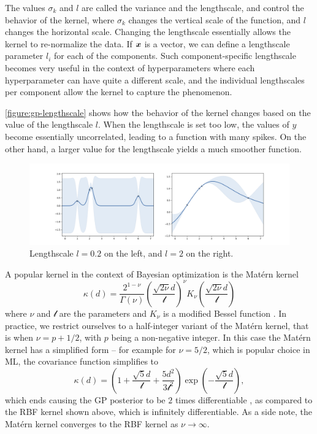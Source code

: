 The values $\sigma_k$ and $l$ are called the variance and the lengthscale, and control
the behavior of the kernel, where $\sigma_k$ changes the vertical scale of the
function, and $l$ changes the horizontal scale. Changing the lengthscale
essentially allows the kernel to re-normalize the data. If ${\boldsymbol{x}}$ is a vector, we
can define a lengthscale parameter $l_i$ for each of the components. Such
component-specific lengthscale becomes very useful in the context of hyperparameters where each hyperparameter
can have quite a different scale, and the individual lengthscales per component
allow the kernel to capture the phenomenon.

\autoref{figure:gp-lengthscale} shows how the behavior of the kernel
changes based on the value of the lengthscale $l$. When the lengthscale
is set too low, the values of $y$ become essentially uncorrelated, leading to a
function with many spikes. On the other hand, a larger value for the lengthscale
yields a much smoother function.

\begin{figure}
  \begin{center}
    \includegraphics[width=1.0\textwidth]{images/gp-lengthscale.png}
    \caption{Lengthscale $l = 0.2$ on the left, and $l = 2$ on the right.}

    \label{figure:gp-lengthscale}
  \end{center}
\end{figure}

A popular kernel in the context of Bayesian optimization is the Mat\'ern kernel
$$
\kappa(d) = \frac{2^{1 - \nu}}{\Gamma(\nu)} \left( \frac{\sqrt{2\nu}d}{\mathcal{l}} \right)^\nu K_\nu \left( \frac{\sqrt{2\nu}d}{\mathcal{l}} \right)
$$
where $\nu$ and $\mathcal{l}$ are the parameters and $K_\nu$ is a modified Bessel function \citep{williams2006gaussian}. In practice, we restrict ourselves to a half-integer variant of the Mat\'ern kernel, that is when $\nu = p + 1/2$, with $p$ being a non-negative integer. In this case the Mat\'ern kernel has a simplified form -- for example for $\nu = 5/2$, which is popular choice in ML, the covariance function simplifies to
$$
\kappa(d) = \left( 1 + \frac{\sqrt{5}d}{\mathcal{l}} + \frac{5d^2}{3\mathcal{l}^2} \right) \exp \left( - \frac{\sqrt{5}d}{\mathcal{l}} \right),
$$
which ends causing the GP posterior to be $2$ times differentiable \citep{williams2006gaussian}, as compared to the RBF kernel shown above, which is infinitely differentiable. As a side note, the Mat\'ern kernel converges to the RBF kernel as $\nu \rightarrow \infty$.

